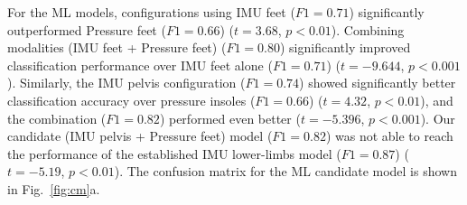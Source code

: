 \documentclass[sensors,article,submit,pdftex,moreauthors]{Definitions/mdpi}
\begin{document}
\begin{table}[ht]
{\begin{tabular}{llcccc}
\hline
\end{tabular}
}

\label{tab:gait_segmentation}
\end{table}
For the ML models, configurations using IMU feet \textcolor{revision2}{($F1=0.71$)} significantly outperformed Pressure feet \textcolor{revision2}{($F1=0.66$) ($t=3.68$, $p<0.01$)}. Combining modalities (IMU feet + Pressure feet) \textcolor{revision2}{($F1=0.80$)} significantly improved classification performance over IMU feet alone \textcolor{revision2}{($F1=0.71$) ($t=-9.644$, $p<0.001$)}. \textcolor{revision2}{Similarly, the IMU pelvis configuration ($F1=0.74$) showed significantly better classification accuracy over pressure insoles ($F1=0.66$) ($t=4.32$, $p<0.01$), and the combination ($F1=0.82$) performed even better ($t=-5.396$, $p< 0.001$).} Our \textcolor{revision2}{candidate (IMU pelvis + Pressure feet)} model ($F1=0.82$) was not able to reach the performance of the established IMU lower-limbs model ($F1=0.87$) ($t=-5.19$, $p<0.01$). The confusion matrix for the ML candidate model is shown in Fig.~\ref{fig:cm}a. 
\end{document}
